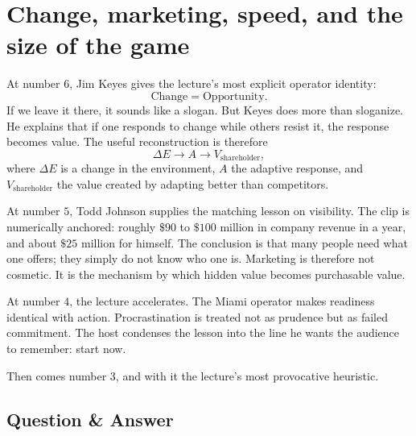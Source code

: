 \section{Change, marketing, speed, and the size of the game}

At number \(6\), Jim Keyes gives the lecture's most explicit operator identity:
\begin{equation}
\text{Change} = \text{Opportunity}.
\end{equation}
If we leave it there, it sounds like a slogan. But Keyes does more than sloganize. He explains that if one responds to change while others resist it, the response becomes value. The useful reconstruction is therefore
\begin{equation}
\Delta E \longrightarrow A \longrightarrow V_{\mathrm{shareholder}},
\end{equation}
where \(\Delta E\) is a change in the environment, \(A\) the adaptive response, and \(V_{\mathrm{shareholder}}\) the value created by adapting better than competitors.

\begin{figure}[h]
\centering
{}
\end{figure}

At number \(5\), Todd Johnson supplies the matching lesson on visibility. The clip is numerically anchored: roughly \(\$90\) to \(\$100\) million in company revenue in a year, and about \(\$25\) million for himself. The conclusion is that many people need what one offers; they simply do not know who one is. Marketing is therefore not cosmetic. It is the mechanism by which hidden value becomes purchasable value.

At number \(4\), the lecture accelerates. The Miami operator makes readiness identical with action. Procrastination is treated not as prudence but as failed commitment. The host condenses the lesson into the line he wants the audience to remember: start now.

Then comes number \(3\), and with it the lecture's most provocative heuristic.

\subsection{Question \& Answer}

